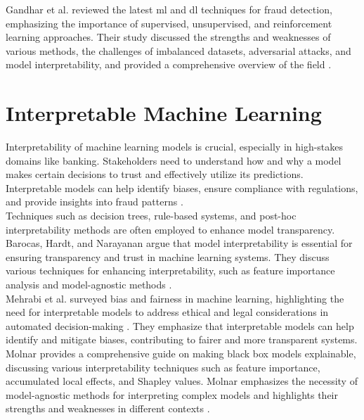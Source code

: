 \documentclass[12pt,a4paper]{report}
\begin{document}
Gandhar et al. reviewed the latest \acrshort{ml} and \acrshort{dl} techniques for fraud detection, emphasizing the importance of supervised, unsupervised, and reinforcement learning approaches. Their study discussed the strengths and weaknesses of various methods, the challenges of imbalanced datasets, adversarial attacks, and model interpretability, and provided a comprehensive overview of the field \citep[p. 1]{gandhar2024fraud}.\\

\clearpage
\section{Interpretable Machine Learning}
Interpretability of machine learning models is crucial, especially in high-stakes domains like banking. Stakeholders need to understand how and why a model makes certain decisions to trust and effectively utilize its predictions. Interpretable models can help identify biases, ensure compliance with regulations, and provide insights into fraud patterns \citep[p.114]{barocas2023fairness}.\\

Techniques such as decision trees, rule-based systems, and post-hoc interpretability methods are often employed to enhance model transparency. Barocas, Hardt, and Narayanan argue that model interpretability is essential for ensuring transparency and trust in machine learning systems. They discuss various techniques for enhancing interpretability, such as feature importance analysis and model-agnostic methods \citep[p.114]{barocas2023fairness}.\\

Mehrabi et al. surveyed bias and fairness in machine learning, highlighting the need for interpretable models to address ethical and legal considerations in automated decision-making \citep[p.12]{mehrabi2021survey}. They emphasize that interpretable models can help identify and mitigate biases, contributing to fairer and more transparent systems.\\

Molnar provides a comprehensive guide on making black box models explainable, discussing various interpretability techniques such as feature importance, accumulated local effects, and Shapley values. Molnar emphasizes the necessity of model-agnostic methods for interpreting complex models and highlights their strengths and weaknesses in different contexts \citep[p.1]{molnar2020interpretable}.\\
\end{document}
